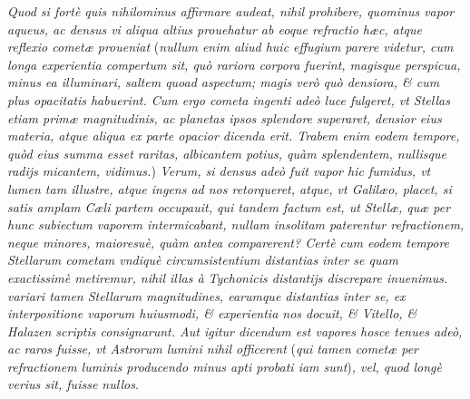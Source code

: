 \documentclass[11pt,twoside,openany]{book}
\begin{document}
\par\bigskip\noindent{}\enspace \textit{Quod si fortè quis nihilominus affirmare audeat, nihil prohibere, quominus vapor aqueus, ac densus vi aliqua altius prouehatur ab eoque refractio hæc, atque reflexio cometæ proueniat }(\textit{nullum enim aliud huic effugium parere videtur, cum longa experientia compertum sit, quò rariora corpora fuerint, magisque perspicua, minus ea illuminari, saltem quoad aspectum; magis verò quò densiora, \& cum plus opacitatis habuerint. Cum ergo cometa ingenti adeò luce fulgeret, vt Stellas etiam primæ magnitudinis, ac planetas ipsos splendore superaret, densior eius materia, atque aliqua ex parte opacior dicenda erit. Trabem enim eodem tempore, quòd eius summa esset raritas, albicantem potius, quàm splendentem, nullisque radijs micantem, vidimus.})\textit{ Verum, si densus adeò fuit vapor hic fumidus, vt lumen tam illustre, atque ingens ad nos retorqueret, atque, vt Galilæo, placet, si satis amplam Cæli partem occupauit, qui tandem factum est, ut Stellæ, quæ per hunc subiectum vaporem intermicabant, nullam insolitam paterentur refractionem, neque minores, maioresuè, quàm antea comparerent? Certè cum eodem tempore Stellarum cometam vndiquè circumsistentium distantias inter se quam }\textit{exactissimè metiremur, nihil illas à Tychonicis distantijs discrepare inuenimus. variari tamen Stellarum magnitudines, earumque distantias inter s}\textit{e, ex interpositione vaporum huiusmodi, \& experientia nos docuit, \& Vitello, \& Halazen scriptis consignarunt. Aut igitur dicendum est vapores hosce tenues adeò, ac raros fuisse, vt Astrorum lumini nihil officerent }(\textit{qui tamen cometæ per refractionem luminis producendo minus apti probati iam sunt})\textit{, vel, quod longè verius sit, fuisse nullos.}
\end{document}

